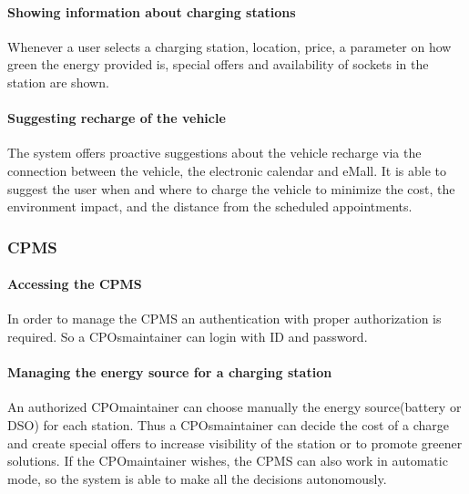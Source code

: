 \paragraph{Showing information about charging stations}
Whenever a user selects a charging station, location, price, a parameter on how green the energy provided is, special offers and availability of sockets in the station are shown.

\paragraph{Suggesting recharge of the vehicle}
The system offers proactive suggestions about the vehicle recharge via the connection between the vehicle, the electronic calendar and \ac{eMall}. It is able to suggest the user when and where to charge the vehicle to minimize the cost, the environment impact, and the distance from the scheduled appointments.

\subsubsection{\ac{CPMS}}
\paragraph{Accessing the \ac{CPMS}}
In order to manage the \ac{CPMS} an authentication with proper authorization is required. So a \acp{CPO}maintainer can login with ID and password.

\paragraph{Managing the energy source for a charging station}
An authorized \ac{CPO}maintainer can choose manually the energy source(battery or \ac{DSO}) for each station.
Thus a \acp{CPO}maintainer can decide the cost of a charge and create special offers to increase visibility of the station or to promote greener solutions. If the \ac{CPO}maintainer wishes, the \ac{CPMS} can also work in automatic mode, so the system is able to make all the decisions autonomously.


